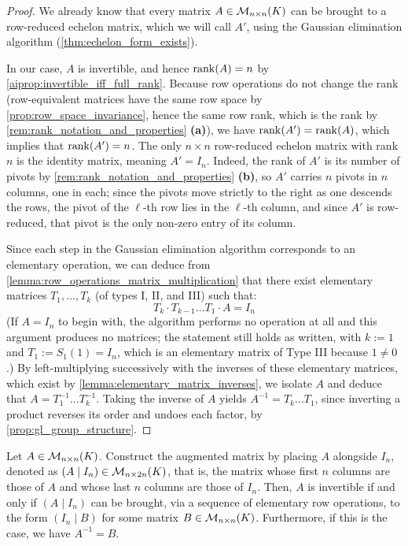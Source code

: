 \begin{proof}
We already know that every matrix $A \in \mathcal{M}_{n \times n}(K)$ can be brought to a row-reduced echelon matrix, which we will call $A'$, using the Gaussian elimination algorithm (\cref{thm:echelon_form_exists}).

In our case, $A$ is invertible, and hence $\operatorname{rank}(A) = n$ by \cref{aiprop:invertible_iff_full_rank}. Because row operations do not change the rank (row-equivalent matrices have the same row space by \cref{prop:row_space_invariance}, hence the same row rank, which is the rank by \cref{rem:rank_notation_and_properties} \textbf{(a)}), we have $\operatorname{rank}(A') = \operatorname{rank}(A)$, which implies that $\operatorname{rank}(A') = n$. The only $n \times n$ row-reduced echelon matrix with rank $n$ is the identity matrix, meaning $A' = I_n$. Indeed, the rank of $A'$ is its number of pivots by \cref{rem:rank_notation_and_properties} \textbf{(b)}, so $A'$ carries $n$ pivots in $n$ columns, one in each; since the pivots move strictly to the right as one descends the rows, the pivot of the $\ell$-th row lies in the $\ell$-th column, and since $A'$ is row-reduced, that pivot is the only non-zero entry of its column.

Since each step in the Gaussian elimination algorithm corresponds to an elementary operation, we can deduce from \cref{lemma:row_operations_matrix_multiplication} that there exist elementary matrices $T_1, \dots, T_k$ (of types I, II, and III) such that:
\begin{equation*}
    T_k \cdot T_{k-1} \dots T_1 \cdot A = I_n
\end{equation*}
(If $A = I_n$ to begin with, the algorithm performs no operation at all and this argument produces no matrices; the statement still holds as written, with $k := 1$ and $T_1 := S_1(1) = I_n$, which is an elementary matrix of Type III because $1 \neq 0$.)
By left-multiplying successively with the inverses of these elementary matrices, which exist by \cref{lemma:elementary_matrix_inverses}, we isolate $A$ and deduce that $A = T_1^{-1} \dots T_k^{-1}$. Taking the inverse of $A$ yields $A^{-1} = T_k \dots T_1$, since inverting a product reverses its order and undoes each factor, by \cref{prop:gl_group_structure}.
\end{proof}

\begin{theorem}
\label{thm:matrix_inversion_algorithm}
Let $A \in \mathcal{M}_{n \times n}(K)$. Construct the augmented matrix by placing $A$ alongside $I_n$, denoted as $(A \mid I_n) \in \mathcal{M}_{n \times 2n}(K)$, that is, the matrix whose first $n$ columns are those of $A$ and whose last $n$ columns are those of $I_n$. Then, $A$ is invertible if and only if $(A \mid I_n)$ can be brought, via a sequence of elementary row operations, to the form $(I_n \mid B)$ for some matrix $B \in \mathcal{M}_{n \times n}(K)$. Furthermore, if this is the case, we have $A^{-1} = B$.
\end{theorem}

